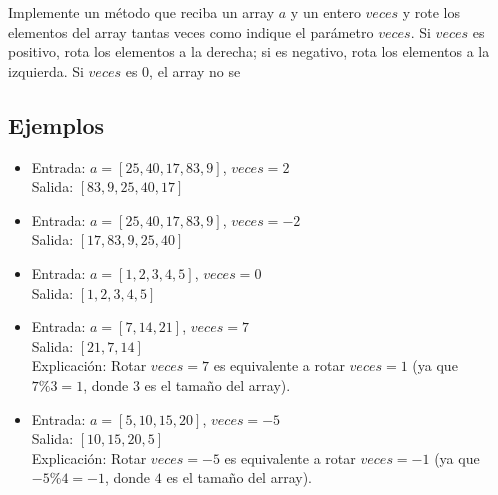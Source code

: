Implemente un método que reciba un array \(a\) y un entero \(veces\) y rote los elementos del array tantas veces como indique el parámetro \(veces\). Si \(veces\) es positivo, rota los elementos a la derecha; si es negativo, rota los elementos a la izquierda. Si \(veces\) es 0, el array no se %


\subsection*{Ejemplos}

\begin{itemize}
    \item Entrada: \(a = [25, 40, 17, 83, 9]\), \(veces = 2\)\\
    Salida: \([83, 9, 25, 40, 17]\)\\

    \item Entrada: \(a = [25, 40, 17, 83, 9]\), \(veces = -2\)\\
    Salida: \([17, 83, 9, 25, 40]\)\\

    \item Entrada: \(a = [1, 2, 3, 4, 5]\), \(veces = 0\)\\
    Salida: \([1, 2, 3, 4, 5]\)\\

    \item Entrada: \(a = [7, 14, 21]\), \(veces = 7\)\\
    Salida: \([21, 7, 14]\)\\
    Explicación: Rotar \(veces = 7\) es equivalente a rotar \(veces = 1\) (ya que \(7 \% 3 = 1\), donde \(3\) es el tamaño del array). 

    \item Entrada: \(a = [5, 10, 15, 20]\), \(veces = -5\)\\
    Salida: \([10, 15, 20, 5]\)\\
    Explicación: Rotar \(veces = -5\) es equivalente a rotar \(veces = -1\) (ya que \(-5 \% 4 = -1\), donde \(4\) es el tamaño del array). 
\end{itemize}

